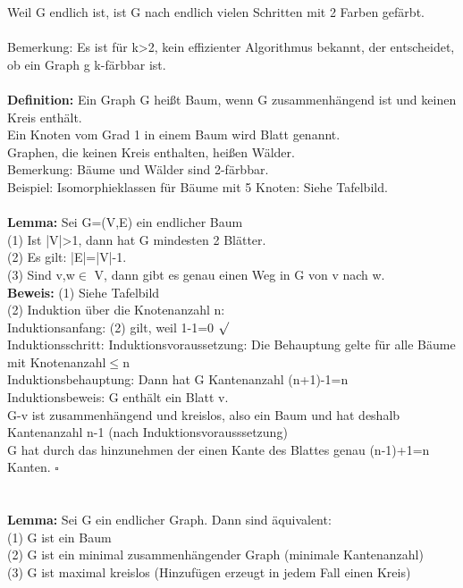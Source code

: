 \documentclass{scrartcl}
\begin{document}
	Weil  G endlich ist, ist G nach endlich vielen Schritten mit 2 Farben gefärbt.\\\\
	Bemerkung: Es ist für k>2, kein effizienter Algorithmus bekannt, der entscheidet, ob ein Graph g k-färbbar ist.\\
	\\\textbf{Definition:} Ein Graph G heißt Baum, wenn G zusammenhängend ist und keinen Kreis enthält.\\
	Ein Knoten vom Grad 1 in einem Baum wird Blatt genannt.\\
	Graphen, die keinen Kreis enthalten, heißen Wälder.\\
	Bemerkung: Bäume und Wälder sind 2-färbbar.\\
	Beispiel: Isomorphieklassen für Bäume mit 5 Knoten: Siehe Tafelbild.\\\\
	\textbf{Lemma:} Sei G=(V,E) ein endlicher Baum\\
	(1) Ist |V|>1, dann hat G mindesten 2 Blätter.\\
	(2) Es gilt: |E|=|V|-1.\\
	(3) Sind v,w$\in$ V, dann gibt es genau einen Weg in G von v nach w.\\
	\textbf{Beweis:}  (1) Siehe Tafelbild\\
	(2) Induktion über die Knotenanzahl n: \\
	Induktionsanfang: (2) gilt, weil 1-1=0 $\surd$\\
	Induktionsschritt: Induktionsvoraussetzung: Die Behauptung gelte für alle Bäume mit Knotenanzahl$\leq$n\\
	Induktionsbehauptung: Dann hat G Kantenanzahl (n+1)-1=n\\
	Induktionsbeweis: G enthält ein Blatt v.\\
	G-v ist zusammenhängend und kreislos, also ein Baum und hat deshalb Kantenanzahl  n-1 (nach Induktionsvorausssetzung)\\
	G  hat durch das hinzunehmen der einen Kante des Blattes genau (n-1)+1=n Kanten. $\square$\\\\\\
	\textbf{Lemma:} Sei G ein endlicher Graph. Dann sind äquivalent:\\
	(1) G ist ein Baum\\
	(2) G ist ein minimal zusammenhängender Graph (minimale Kantenanzahl)\\
	(3) G ist maximal kreislos (Hinzufügen erzeugt in jedem Fall einen Kreis)\\
	
	
	
\end{document}
